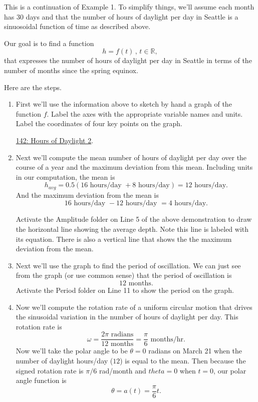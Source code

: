 \documentclass{ximera}
\begin{document}
\begin{example}  \label{EDFrGGRGdsfRRER}
This is a continuation of Example 1. To simplify things, we'll assume each month has $30$ days and that the number of hours of daylight per day in Seattle is a sinuosoidal function of time as described above.

Our goal is to find a function 
\[
  h = f(t) \, , \, t\in \mathbb{R},
\] 
that expresses the number of hours of daylight per day in Seattle in terms of the number of months since the spring equinox.


Here are the steps.

\begin{enumerate}

\item  First we'll use the information above to sketch by hand a graph of the function $f$. Label the axes with the appropriate variable names and units. Label the coordinates of four key points on the graph.

\href{https://www.desmos.com/calculator/gw4xkdcvhi}{142: Hours of Daylight 2}.

 
\begin{onlineOnly}
    \begin{center}
\end{center}
\end{onlineOnly}

\item Next we'll compute the mean number of hours of daylight per day over the course of a year and the maximum deviation from this mean. Including units in our computation, the mean is 
\[
    h_{avg} = 0.5 ( 16 \text{ hours/day } + 8 \text{ hours/day}) = 12 \text{ hours/day} . 
\]
And the maximum deviation from the mean is
\[
     16 \text{ hours/day } - 12 \text{ hours/day } = 4 \text{ hours/day}.
\]

Activate the Amplitude folder on Line 5 of the above demonstration to draw the horizontal line showing the average depth. Note this line is labeled with its equation. There is also a vertical line that shows the the maximum deviation from the mean.

\item Next we'll use the graph to find the period of oscillation. We can just see from the graph (or use common sense) that the period of oscillation is
\[
     12 \text{ months}.
\]
Activate the Period folder on Line 11 to show the period on the graph.

\item Now we'll compute the rotation rate of a uniform circular motion that drives the sinusoidal variation in the number of hours of daylight per day. This rotation rate is
\[
  \omega = \frac{2\pi \text{ radians}}{12 \text{ months}} = \frac{\pi}{6} \text{ months/hr} .
\]
Now we'll take the polar angle to be $\theta=0$ radians on March 21 when the number of daylight hours/day ($12$) is equal to the mean.  Then because the signed rotation rate is $\pi/6$ rad/month and $theta = 0$ when $t=0$, our polar angle function is
\[
   \theta = a(t) = \frac{\pi}{6}t.
\]


\end{enumerate}
\end{example}
\end{document}
